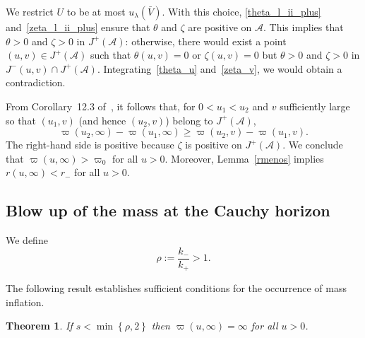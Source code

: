 \documentclass[a4paper,11pt,oneside,reqno]{amsart}
\newcommand{\s}{s}
\newtheorem{Thm}{Theorem}[section]
\newcommand{\cal}{\mathcal}
\renewcommand{\Psi}{\rho}
\begin{document}
We restrict $U$ to be at most $u_\lambda(\bar V)$.
With this choice, \eqref{theta_l_ii_plus} and~\eqref{zeta_l_ii_plus} ensure that
$\theta$ and $\zeta$ are positive on ${\cal A}$. 
This implies that $\theta>0$ and $\zeta>0$ in $J^+({\cal A})$:
otherwise, there would exist a point $(u,v)\in J^+({\cal A})$ such that $\theta(u,v)=0$ or $\zeta(u,v)=0$
but $\theta>0$ and $\zeta>0$ in $J^-(u,v)\cap J^+({\cal A})$. Integrating~\eqref{theta_u} and~\eqref{zeta_v},
we would obtain a contradiction.

From Corollary~12.3 of~\cite{Dafermos2}, it follows that, for $0<u_1<u_2$ and $v$ sufficiently large
so that $(u_1,v)$ (and hence $(u_2,v)$) belong to $J^+({\cal A})$,
$$
\varpi(u_2,\infty)-\varpi(u_1,\infty)\geq \varpi(u_2,v)-\varpi(u_1,v).
$$
The right-hand side is positive because $\zeta$ is positive on $J^+({\cal A})$. We conclude
that $\varpi(u,\infty)>\varpi_0$ for all $u>0$. Moreover, Lemma~\ref{rmenos} implies $r(u,\infty)<
r_-$ for all $u>0$.

\subsection{Blow up of the mass at the Cauchy horizon}

We define 
\begin{equation}\label{def_psi}
\Psi:=\frac{k_-}{k_+} > 1.
\end{equation}

The following result establishes sufficient conditions for the occurrence of mass inflation.

\begin{Thm}\label{mass_inflation_thm}
If $\s<\min\left\{\rho,2\right\}$ then $\varpi(u,\infty)=\infty$ for all $u>0$. 
\end{Thm}
\end{document}
